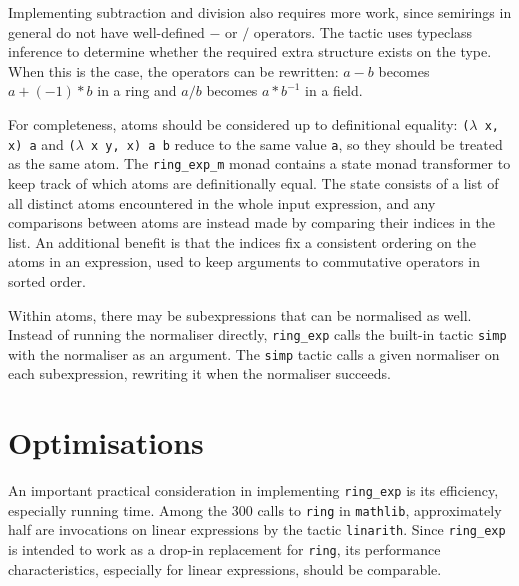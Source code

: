 \documentclass{llncs}
\newcommand{\lean}[1]{\texttt{#1}\xspace} %
\newcommand{\ring}{\lean{ring}}
\newcommand{\ringexp}{\lean{ring\_exp}}
\begin{document}
Implementing subtraction and division also requires more work,
since semirings in general do not have well-defined $-$ or $/$ operators.
The tactic uses typeclass inference to determine whether the required extra structure exists on the type.
When this is the case, the operators can be rewritten:
$a - b$ becomes $a + (-1) * b$ in a ring
and $a / b$ becomes $a * b^{-1}$ in a field.

For completeness, atoms should be considered up to definitional equality:
\lean{($\lambda$ x, x) a} and \lean{($\lambda$ x y, x) a b} reduce to the same value \lean{a},
so %
they should be treated as the same atom.
The \lean{ring\_exp\_m} monad contains a state monad transformer to keep track of which atoms are definitionally equal.
The state consists of a list of all distinct atoms encountered in the whole input expression,
and any comparisons between atoms are instead made by comparing their indices in the list.
An additional benefit is that the indices fix a consistent ordering on the atoms in an expression,
used to keep arguments to commutative operators in sorted order.

Within atoms, there may be subexpressions that can be normalised as well.
Instead of running the normaliser directly, \ringexp calls the built-in tactic \lean{simp} with the normaliser as an argument.
The \lean{simp} tactic calls a given normaliser on each subexpression,
rewriting it when the normaliser succeeds.

\section{Optimisations}

An important practical consideration in implementing \ringexp is its efficiency, especially running time.
Among the 300 calls to \ring in \texttt{mathlib}, approximately half are invocations on linear expressions by the tactic \lean{linarith}.
Since \ringexp is intended to work as a drop-in replacement for \lean{ring},
its performance characteristics, especially for linear expressions, should be comparable.
\end{document}
